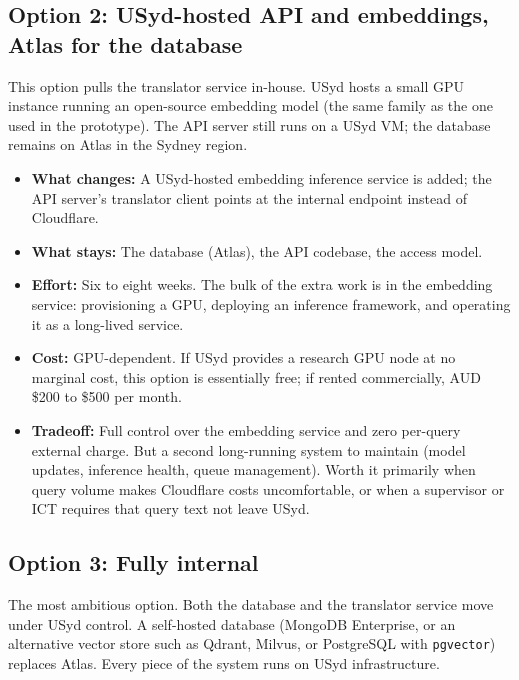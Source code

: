 \documentclass[11pt,a4paper]{article}
\begin{document}
\subsection{Option 2: USyd-hosted API and embeddings, Atlas for the database}

This option pulls the translator service in-house. USyd hosts a small GPU instance running an open-source embedding model (the same family as the one used in the prototype). The API server still runs on a USyd VM; the database remains on Atlas in the Sydney region.

\begin{itemize}[leftmargin=1.5em,itemsep=2pt]
  \item \textbf{What changes:} A USyd-hosted embedding inference service is added; the API server's translator client points at the internal endpoint instead of Cloudflare.
  \item \textbf{What stays:} The database (Atlas), the API codebase, the access model.
  \item \textbf{Effort:} Six to eight weeks. The bulk of the extra work is in the embedding service: provisioning a GPU, deploying an inference framework, and operating it as a long-lived service.
  \item \textbf{Cost:} GPU-dependent. If USyd provides a research GPU node at no marginal cost, this option is essentially free; if rented commercially, AUD \$200 to \$500 per month.
  \item \textbf{Tradeoff:} Full control over the embedding service and zero per-query external charge. But a second long-running system to maintain (model updates, inference health, queue management). Worth it primarily when query volume makes Cloudflare costs uncomfortable, or when a supervisor or ICT requires that query text not leave USyd.
\end{itemize}

\subsection{Option 3: Fully internal}

The most ambitious option. Both the database and the translator service move under USyd control. A self-hosted database (MongoDB Enterprise, or an alternative vector store such as Qdrant, Milvus, or PostgreSQL with \texttt{pgvector}) replaces Atlas. Every piece of the system runs on USyd infrastructure.
\end{document}
